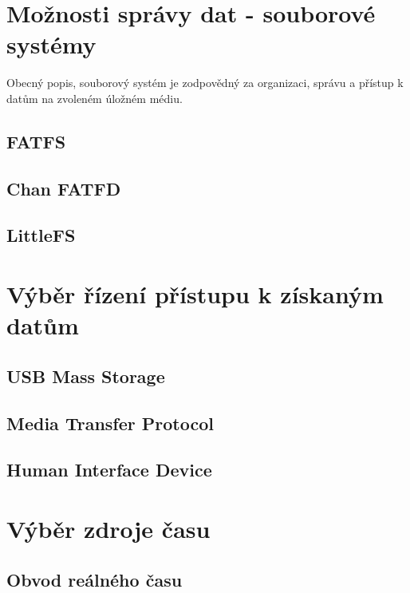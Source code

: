 \section{Možnosti správy dat - souborové systémy} 
Obecný popis, souborový systém je zodpovědný za organizaci, správu a přístup k datům na zvoleném úložném médiu.

\subsection{FATFS}

\subsection{Chan FATFD}

\subsection{LittleFS}



\section{Výběr řízení přístupu k získaným datům}

\subsection{USB Mass Storage}

\subsection{Media Transfer Protocol}

\subsection{Human Interface Device}

\section{Výběr zdroje času}

\subsection{Obvod reálného času}

